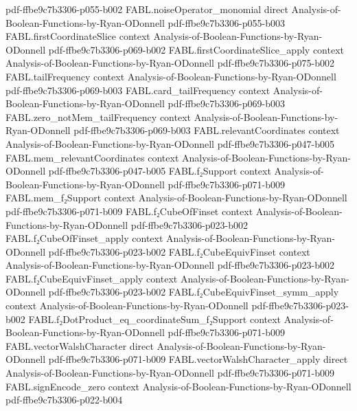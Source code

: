 \begin{theorem}
  {pdf-ffbe9c7b3306-p055-b002}
\proofstep
  {FABL.noiseOperator_monomial}
  {direct}
  {Analysis-of-Boolean-Functions-by-Ryan-ODonnell}
  {pdf-ffbe9c7b3306-p055-b003}
\proofstep
  {FABL.firstCoordinateSlice}
  {context}
  {Analysis-of-Boolean-Functions-by-Ryan-ODonnell}
  {pdf-ffbe9c7b3306-p069-b002}
\proofstep
  {FABL.firstCoordinateSlice_apply}
  {context}
  {Analysis-of-Boolean-Functions-by-Ryan-ODonnell}
  {pdf-ffbe9c7b3306-p075-b002}
\proofstep
  {FABL.tailFrequency}
  {context}
  {Analysis-of-Boolean-Functions-by-Ryan-ODonnell}
  {pdf-ffbe9c7b3306-p069-b003}
\proofstep
  {FABL.card_tailFrequency}
  {context}
  {Analysis-of-Boolean-Functions-by-Ryan-ODonnell}
  {pdf-ffbe9c7b3306-p069-b003}
\proofstep
  {FABL.zero_notMem_tailFrequency}
  {context}
  {Analysis-of-Boolean-Functions-by-Ryan-ODonnell}
  {pdf-ffbe9c7b3306-p069-b003}
\proofstep
  {FABL.relevantCoordinates}
  {context}
  {Analysis-of-Boolean-Functions-by-Ryan-ODonnell}
  {pdf-ffbe9c7b3306-p047-b005}
\proofstep
  {FABL.mem_relevantCoordinates}
  {context}
  {Analysis-of-Boolean-Functions-by-Ryan-ODonnell}
  {pdf-ffbe9c7b3306-p047-b005}
\proofstep
  {FABL.f₂Support}
  {context}
  {Analysis-of-Boolean-Functions-by-Ryan-ODonnell}
  {pdf-ffbe9c7b3306-p071-b009}
\proofstep
  {FABL.mem_f₂Support}
  {context}
  {Analysis-of-Boolean-Functions-by-Ryan-ODonnell}
  {pdf-ffbe9c7b3306-p071-b009}
\proofstep
  {FABL.f₂CubeOfFinset}
  {context}
  {Analysis-of-Boolean-Functions-by-Ryan-ODonnell}
  {pdf-ffbe9c7b3306-p023-b002}
\proofstep
  {FABL.f₂CubeOfFinset_apply}
  {context}
  {Analysis-of-Boolean-Functions-by-Ryan-ODonnell}
  {pdf-ffbe9c7b3306-p023-b002}
\proofstep
  {FABL.f₂CubeEquivFinset}
  {context}
  {Analysis-of-Boolean-Functions-by-Ryan-ODonnell}
  {pdf-ffbe9c7b3306-p023-b002}
\proofstep
  {FABL.f₂CubeEquivFinset_apply}
  {context}
  {Analysis-of-Boolean-Functions-by-Ryan-ODonnell}
  {pdf-ffbe9c7b3306-p023-b002}
\proofstep
  {FABL.f₂CubeEquivFinset_symm_apply}
  {context}
  {Analysis-of-Boolean-Functions-by-Ryan-ODonnell}
  {pdf-ffbe9c7b3306-p023-b002}
\proofstep
  {FABL.f₂DotProduct_eq_coordinateSum_f₂Support}
  {context}
  {Analysis-of-Boolean-Functions-by-Ryan-ODonnell}
  {pdf-ffbe9c7b3306-p071-b009}
\proofstep
  {FABL.vectorWalshCharacter}
  {direct}
  {Analysis-of-Boolean-Functions-by-Ryan-ODonnell}
  {pdf-ffbe9c7b3306-p071-b009}
\proofstep
  {FABL.vectorWalshCharacter_apply}
  {direct}
  {Analysis-of-Boolean-Functions-by-Ryan-ODonnell}
  {pdf-ffbe9c7b3306-p071-b009}
\proofstep
  {FABL.signEncode_zero}
  {context}
  {Analysis-of-Boolean-Functions-by-Ryan-ODonnell}
  {pdf-ffbe9c7b3306-p022-b004}

\end{theorem}
